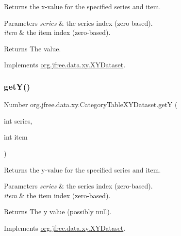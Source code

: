 Returns the x-\/value for the specified series and item.


\begin{DoxyParams}{Parameters}
{\em series} & the series index (zero-\/based). \\
\hline
{\em item} & the item index (zero-\/based).\\
\hline
\end{DoxyParams}
\begin{DoxyReturn}{Returns}
The value. 
\end{DoxyReturn}


Implements \mbox{\hyperlink{interfaceorg_1_1jfree_1_1data_1_1xy_1_1_x_y_dataset_a85c75ba5b69b551e96afd29d1732ba22}{org.\+jfree.\+data.\+xy.\+X\+Y\+Dataset}}.

\mbox{\label{classorg_1_1jfree_1_1data_1_1xy_1_1_category_table_x_y_dataset_afd52434e62b1890759230d8f4aa6059f}} 
\subsubsection{\texorpdfstring{get\+Y()}{getY()}}
{\footnotesize\ttfamily Number org.\+jfree.\+data.\+xy.\+Category\+Table\+X\+Y\+Dataset.\+getY (\begin{DoxyParamCaption}\item[{int}]{series,  }\item[{int}]{item }\end{DoxyParamCaption})}

Returns the y-\/value for the specified series and item.


\begin{DoxyParams}{Parameters}
{\em series} & the series index (zero-\/based). \\
\hline
{\em item} & the item index (zero-\/based).\\
\hline
\end{DoxyParams}
\begin{DoxyReturn}{Returns}
The y value (possibly {\ttfamily null}). 
\end{DoxyReturn}


Implements \mbox{\hyperlink{interfaceorg_1_1jfree_1_1data_1_1xy_1_1_x_y_dataset_aa915867221e0f94021bad3140db5254e}{org.\+jfree.\+data.\+xy.\+X\+Y\+Dataset}}.

